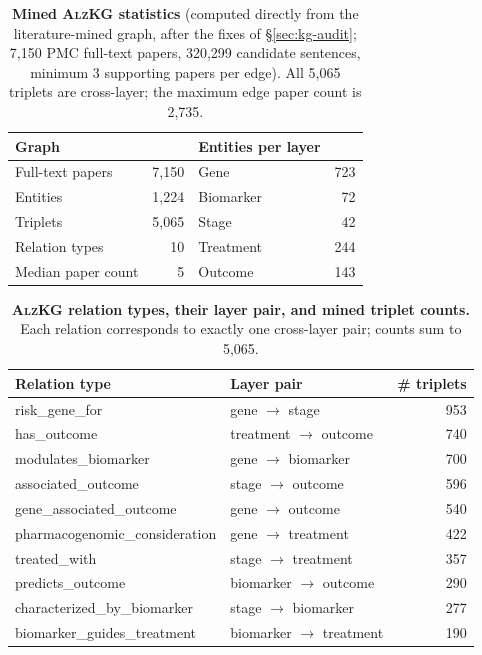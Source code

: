 \documentclass{article}
\begin{document}
\begin{table}[t]
\centering
\caption{\textbf{Mined \textsc{AlzKG} statistics} (computed directly from the literature-mined graph, after the fixes of \S\ref{sec:kg-audit}; 7{,}150 PMC full-text papers, 320{,}299 candidate sentences, minimum 3 supporting papers per edge). All 5{,}065 triplets are cross-layer; the maximum edge paper count is 2{,}735.}
\label{tab:kgstats}
\small
\begin{tabular}{lr@{\hskip 1.4em}lr}
\toprule
\textbf{Graph} & & \textbf{Entities per layer} & \\
\midrule
Full-text papers    & 7{,}150 & Gene       & 723 \\
Entities            & 1{,}224 & Biomarker  & 72 \\
Triplets            & 5{,}065 & Stage      & 42 \\
Relation types      & 10  & Treatment  & 244 \\
Median paper count  & 5   & Outcome    & 143 \\
\bottomrule
\end{tabular}
\end{table}

\begin{table}[t]
\centering
\caption{\textbf{\textsc{AlzKG} relation types, their layer pair, and mined triplet counts.} Each relation corresponds to exactly one cross-layer pair; counts sum to 5{,}065.}
\label{tab:relations}
\small
\begin{tabular}{llr}
\toprule
\textbf{Relation type} & \textbf{Layer pair} & \textbf{\# triplets} \\
\midrule
risk\_gene\_for                & gene $\to$ stage          & 953 \\
has\_outcome                   & treatment $\to$ outcome   & 740 \\
modulates\_biomarker           & gene $\to$ biomarker      & 700 \\
associated\_outcome            & stage $\to$ outcome       & 596 \\
gene\_associated\_outcome      & gene $\to$ outcome        & 540 \\
pharmacogenomic\_consideration & gene $\to$ treatment      & 422 \\
treated\_with                  & stage $\to$ treatment     & 357 \\
predicts\_outcome              & biomarker $\to$ outcome   & 290 \\
characterized\_by\_biomarker   & stage $\to$ biomarker     & 277 \\
biomarker\_guides\_treatment   & biomarker $\to$ treatment & 190 \\
\bottomrule
\end{tabular}
\end{table}
\end{document}
